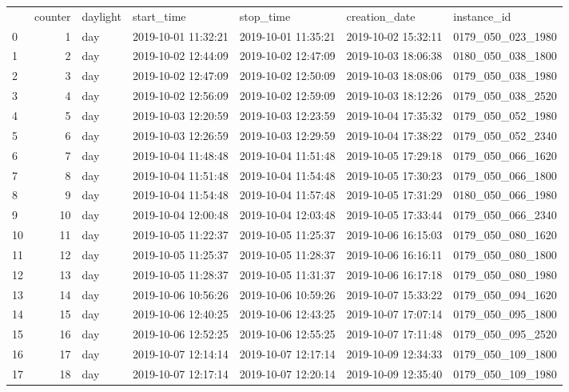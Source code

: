 \begin{longtable}{lrlllll}
 & counter & daylight & start_time & stop_time & creation_date & instance_id \\
0 & 1 & day & 2019-10-01 11:32:21 & 2019-10-01 11:35:21 & 2019-10-02 15:32:11 & 0179_050_023_1980 \\
1 & 2 & day & 2019-10-02 12:44:09 & 2019-10-02 12:47:09 & 2019-10-03 18:06:38 & 0180_050_038_1800 \\
2 & 3 & day & 2019-10-02 12:47:09 & 2019-10-02 12:50:09 & 2019-10-03 18:08:06 & 0179_050_038_1980 \\
3 & 4 & day & 2019-10-02 12:56:09 & 2019-10-02 12:59:09 & 2019-10-03 18:12:26 & 0179_050_038_2520 \\
4 & 5 & day & 2019-10-03 12:20:59 & 2019-10-03 12:23:59 & 2019-10-04 17:35:32 & 0179_050_052_1980 \\
5 & 6 & day & 2019-10-03 12:26:59 & 2019-10-03 12:29:59 & 2019-10-04 17:38:22 & 0179_050_052_2340 \\
6 & 7 & day & 2019-10-04 11:48:48 & 2019-10-04 11:51:48 & 2019-10-05 17:29:18 & 0179_050_066_1620 \\
7 & 8 & day & 2019-10-04 11:51:48 & 2019-10-04 11:54:48 & 2019-10-05 17:30:23 & 0179_050_066_1800 \\
8 & 9 & day & 2019-10-04 11:54:48 & 2019-10-04 11:57:48 & 2019-10-05 17:31:29 & 0180_050_066_1980 \\
9 & 10 & day & 2019-10-04 12:00:48 & 2019-10-04 12:03:48 & 2019-10-05 17:33:44 & 0179_050_066_2340 \\
10 & 11 & day & 2019-10-05 11:22:37 & 2019-10-05 11:25:37 & 2019-10-06 16:15:03 & 0179_050_080_1620 \\
11 & 12 & day & 2019-10-05 11:25:37 & 2019-10-05 11:28:37 & 2019-10-06 16:16:11 & 0179_050_080_1800 \\
12 & 13 & day & 2019-10-05 11:28:37 & 2019-10-05 11:31:37 & 2019-10-06 16:17:18 & 0179_050_080_1980 \\
13 & 14 & day & 2019-10-06 10:56:26 & 2019-10-06 10:59:26 & 2019-10-07 15:33:22 & 0179_050_094_1620 \\
14 & 15 & day & 2019-10-06 12:40:25 & 2019-10-06 12:43:25 & 2019-10-07 17:07:14 & 0179_050_095_1800 \\
15 & 16 & day & 2019-10-06 12:52:25 & 2019-10-06 12:55:25 & 2019-10-07 17:11:48 & 0179_050_095_2520 \\
16 & 17 & day & 2019-10-07 12:14:14 & 2019-10-07 12:17:14 & 2019-10-09 12:34:33 & 0179_050_109_1800 \\
17 & 18 & day & 2019-10-07 12:17:14 & 2019-10-07 12:20:14 & 2019-10-09 12:35:40 & 0179_050_109_1980 \\

\end{longtable}
